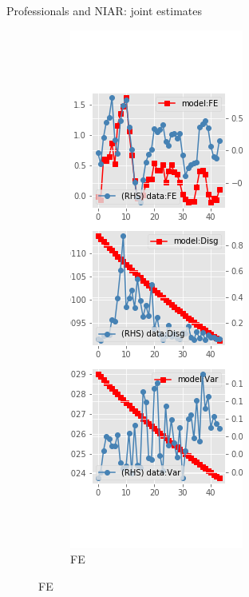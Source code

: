 \documentclass{beamer}
\begin{document}
\begin{frame}{Professionals and NIAR: joint estimates}
	\begin{figure}[ht]
		\label{NI_diag_SPF_joint}
		\begin{subfigure}[b]{0.2\textwidth}
			\centering
			\caption{FE}
			\includegraphics[width=\textwidth, height = 0.8\textheight]{figuresDraft/spf_ni_est_joint_diag0.png}

\end{subfigure}
\end{figure}
\end{frame}
\end{document}
